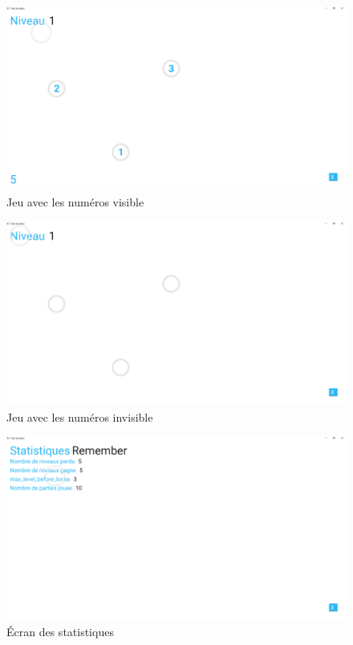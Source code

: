 \documentclass{polytech/polytech}
\begin{document}
\begin{figure}
    \centering
    \includegraphics[width=15cm]{img/screenshots/jeu.PNG}
    \caption{Jeu avec les numéros visible}
    \label{fig:screenshot_game}
\end{figure}

\begin{figure}
    \centering
    \includegraphics[width=15cm]{img/screenshots/jeu_cachee.PNG}
    \caption{Jeu avec les numéros invisible}
    \label{fig:screenshot_game_invisible}
\end{figure}

\begin{figure}
    \centering
    \includegraphics[width=15cm]{img/screenshots/statistiques.PNG}
    \caption{Écran des statistiques}
    \label{fig:screenshot_statistics}
\end{figure}
\end{document}
